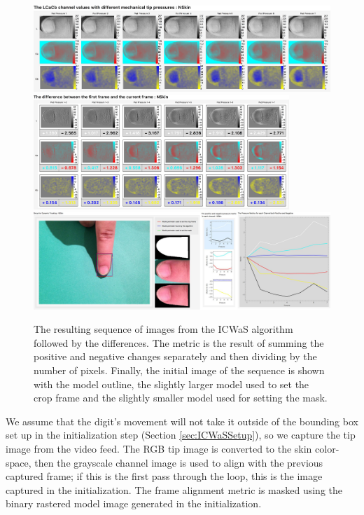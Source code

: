 \begin{figure}[h!]
  \centering
    \includegraphics[width=1.00\textwidth]{Chapter4/Figs/Final_Fig_Channels_NSkin.jpg}
    \includegraphics[width=0.86\textwidth]{Chapter4/Figs/Final_Fig_Total_Difference_NSkin.jpg}
    \includegraphics[width=1.00\textwidth]{Chapter4/Figs/Final_Fig_Misc_NSkin.jpg}
        \caption{The resulting sequence of images from the ICWaS algorithm followed by the differences. The metric is the result of summing the positive and negative changes separately and then dividing by the number of pixels. Finally, the initial image of the sequence is shown with the model outline, the slightly larger model used to set the crop frame and the slightly smaller model used for setting the mask.}\label{fig:ICWaSResultNSkin}
\end{figure}

We assume that the digit's movement will not take it outside of the bounding box set up in the initialization step (Section \ref{sec:ICWaSSetup}), so we capture the tip image from the video feed. The RGB tip image is converted to the skin color-space, then the grayscale channel image is used to align with the previous captured frame; if this is the first pass through the loop, this is the image captured in the initialization. The frame alignment metric is masked using the binary rastered model image generated in the initialization.

